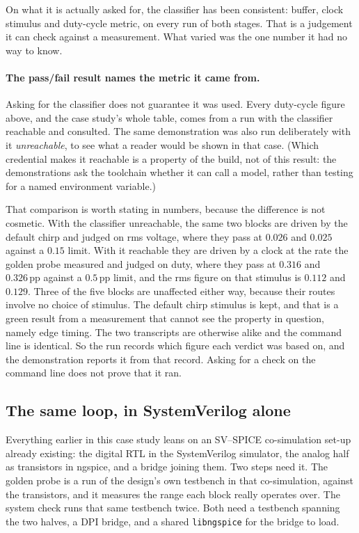 \documentclass[11pt,a4paper]{article}
\newcommand{\unit}[1]{\,\textrm{#1}}
\begin{document}
On what it is actually asked for, the classifier has been consistent:
buffer, clock stimulus and duty-cycle metric, on every run of both
stages. That is a judgement it can check against a measurement. What
varied was the one number it had no way to know.

\paragraph{The pass/fail result names the metric it came from.}
Asking for the classifier does not guarantee it was used. Every
duty-cycle figure above, and the case study's whole table, comes from a
run with the classifier reachable and consulted. The same
demonstration was also run deliberately with it \emph{unreachable}, to
see what a reader would be shown in that case. (Which credential makes
it reachable is a property of the build, not of this result: the
demonstrations ask the toolchain whether it can call a model, rather
than testing for a named environment variable.)

That comparison is worth stating in numbers, because the difference is
not cosmetic. With the classifier unreachable, the same two blocks are
driven by the default chirp and judged on rms voltage, where they pass
at $0.026$ and $0.025$ against a $0.15$ limit. With it reachable they
are driven by a clock at the rate the golden probe measured and judged
on duty, where they pass at $0.316$ and $0.326\unit{pp}$ against a
$0.5\unit{pp}$ limit, and the rms figure on that stimulus is $0.112$
and $0.129$. Three of the five blocks are unaffected either way,
because their routes involve no choice of stimulus. The default chirp
stimulus is kept, and that is a green result from a measurement that
cannot see the property in question, namely edge timing. The two
transcripts are otherwise alike and the command line is identical. So
the run records which figure each verdict was based on, and the
demonstration reports it from that record. Asking for a check on the
command line does not prove that it ran.


\subsection{The same loop, in SystemVerilog alone}
\label{sec:nocosim}

Everything earlier in this case study leans on an SV--SPICE
co-simulation set-up already existing: the digital RTL in the
SystemVerilog simulator, the analog half as transistors in ngspice,
and a bridge joining them. Two steps need it. The golden probe is a
run of the design's own testbench in that co-simulation, against the
transistors, and it measures the range each block really operates
over. The system check runs that same testbench twice. Both need a
testbench spanning the two halves, a DPI bridge, and a shared
\texttt{libngspice} for the bridge to load.
\end{document}
